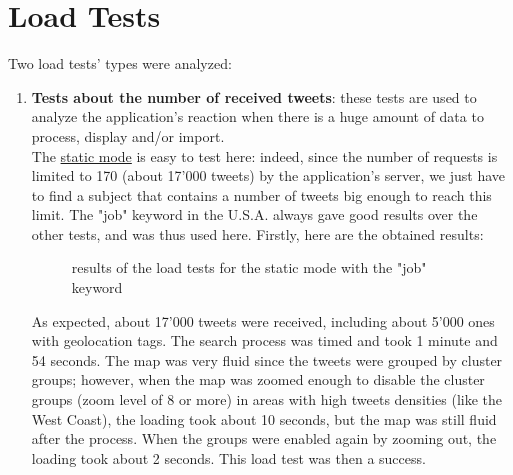 \documentclass[a4paper,11pt]{report}
\begin{document}
\section{Load Tests}
Two load tests' types were analyzed:
\begin{enumerate}
	\item \textbf{Tests about the number of received tweets}: these tests are used to analyze the application's reaction when there is a huge amount of data to process, display and/or import.\\
	
	The \underline{static mode} is easy to test here: indeed, since the number of requests is limited to 170 (about 17'000 tweets) by the application's server, we just have to find a subject that contains a number of tweets big enough to reach this limit. The "job" keyword in the U.S.A. always gave good results over the other tests, and was thus used here. Firstly, here are the obtained results:
	\begin{figure}[H]
	\vspace{-5pt}
	\begin{center}
	\vspace{-5pt}
	\caption{results of the load tests for the static mode with the "job" keyword}
	\end{center}
	\end{figure}
	\vspace{-10pt}
	
	As expected, about 17'000 tweets were received, including about 5'000 ones with geolocation tags. The search process was timed and took 1 minute and 54 seconds. The map was very fluid since the tweets were grouped by cluster groups; however, when the map was zoomed enough to disable the cluster groups (zoom level of 8 or more) in areas with high tweets densities (like the West Coast), the loading took about 10 seconds, but the map was still fluid after the process. When the groups were enabled again by zooming out, the loading took about 2 seconds. This load test was then a success.\\	
	\newpage
	

\end{enumerate}
\end{document}
